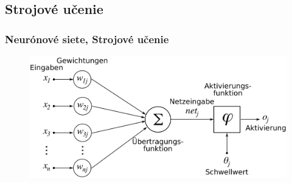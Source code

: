 \documentclass{beamer}
\begin{document}
\subsection{Strojové učenie}
% 


\begin{frame}
\frametitle{Neurónové siete, Strojové učenie}
\begin{figure}
\includegraphics[height=0.6\textheight]{images/neural_net.png}
\end{figure}
\end{frame}
\end{document}
